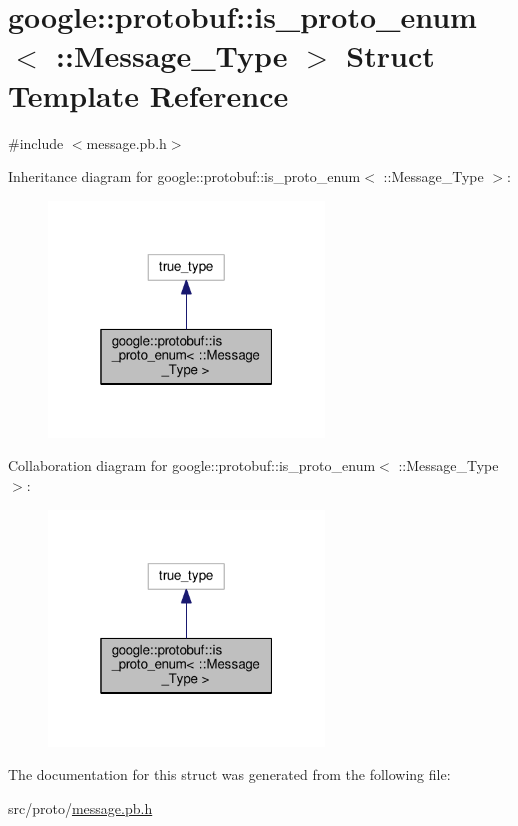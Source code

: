 \hypertarget{structgoogle_1_1protobuf_1_1is__proto__enum_3_01_1_1_message___type_01_4}{}\section{google\+:\+:protobuf\+:\+:is\+\_\+proto\+\_\+enum$<$ \+:\+:Message\+\_\+\+Type $>$ Struct Template Reference}
\label{structgoogle_1_1protobuf_1_1is__proto__enum_3_01_1_1_message___type_01_4}


{\ttfamily \#include $<$message.\+pb.\+h$>$}



Inheritance diagram for google\+:\+:protobuf\+:\+:is\+\_\+proto\+\_\+enum$<$ \+:\+:Message\+\_\+\+Type $>$\+:\nopagebreak
\begin{figure}[H]
\begin{center}
\leavevmode
\includegraphics[width=208pt]{structgoogle_1_1protobuf_1_1is__proto__enum_3_01_1_1_message___type_01_4__inherit__graph}
\end{center}
\end{figure}


Collaboration diagram for google\+:\+:protobuf\+:\+:is\+\_\+proto\+\_\+enum$<$ \+:\+:Message\+\_\+\+Type $>$\+:\nopagebreak
\begin{figure}[H]
\begin{center}
\leavevmode
\includegraphics[width=208pt]{structgoogle_1_1protobuf_1_1is__proto__enum_3_01_1_1_message___type_01_4__coll__graph}
\end{center}
\end{figure}


The documentation for this struct was generated from the following file\+:\begin{DoxyCompactItemize}
\item 
src/proto/\hyperlink{message_8pb_8h}{message.\+pb.\+h}\end{DoxyCompactItemize}
